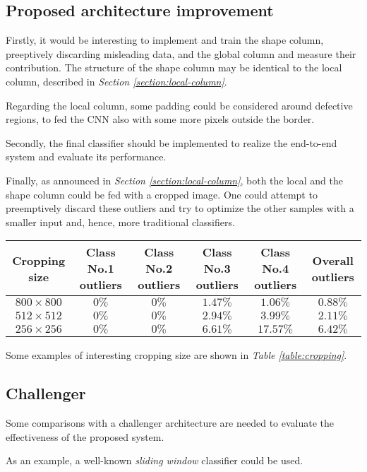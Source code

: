 \subsection{Proposed architecture improvement}
\par{
	Firstly, it would be interesting to implement and train the shape column, preeptively discarding misleading data, and the global column and measure their contribution. The structure of the shape column may be identical to the local column, described in \emph{Section \ref{section:local-column}}.
}
\par{
	Regarding the local column, some padding could be considered around defective regions, to fed the CNN also with some more pixels outside the border.
}
\par{
	Secondly, the final classifier should be implemented to realize the end-to-end system and evaluate its performance.
}
\par{
	Finally, as announced in \emph{Section \ref{section:local-column}}, both the local and the shape column could be fed with a cropped image. One could attempt to preemptively discard these outliers and try to optimize the other samples with a smaller input and, hence, more traditional classifiers.
}
\begin{table*}
	\centering
	\normalsize
	\begin{tabular}{|c|c|c|c|c|c|}
		\hline
		\textbf{Cropping size} & \textbf{Class No.1 outliers} & \textbf{Class No.2 outliers}& \textbf{Class No.3 outliers} & \textbf{Class No.4 outliers} & \textbf{Overall outliers}\\\hline
		$800\times 800$ & $0\%$ & $0\%$ & $1.47\%$ & $1.06\%$ & $0.88\%$\\
		$512\times 512$ & $0\%$ & $0\%$ & $2.94\%$ & $3.99\%$ & $2.11\%$\\
		$256\times 256$ & $0\%$ & $0\%$ & $6.61\%$ & $17.57\%$& $6.42\%$\\
		\hline
	\end{tabular}
	\vspace{0.5cm}
	\caption{Cropping examples.}\label{table:cropping}
\end{table*}
\par{
	Some examples of interesting cropping size are shown in \emph{Table \ref{table:cropping}}.
}
\subsection{Challenger}
\par{
	Some comparisons with a challenger architecture are needed to evaluate the effectiveness of the proposed system.
}
\par{
	As an example, a well-known \emph{sliding window} classifier could be used.
}
